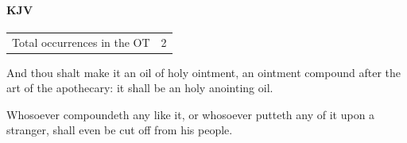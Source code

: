 		\paragraph{KJV}
			\label{COMPOUND-OT-KJV}
	
			\begin{tabular}{ll}
				Total occurrences in the OT & 2
			\end{tabular}
			
			\begin{compactdesc}
				\item[Exodus 30:25] And thou shalt make it an oil of holy ointment, an ointment compound after the art of the apothecary: it shall be an holy anointing oil.
				\item[Exodus 30:33]	Whosoever compoundeth any like it, or whosoever putteth any of it upon a stranger, shall even be cut off from his people.
			\end{compactdesc}
			
		
			
				
			
